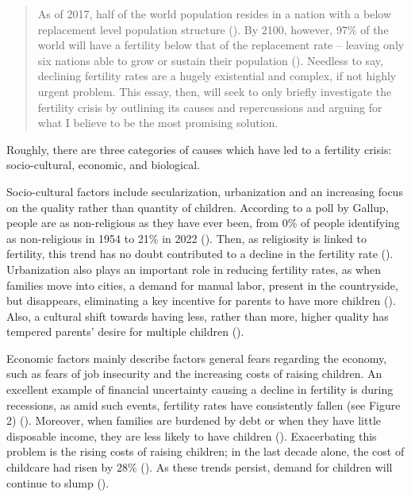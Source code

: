 
\begin{abstract}
As of 2017, half of the world population resides in a nation with a below replacement level population structure (\cite{frejka2017half}). By 2100, however, 97\% of the world will have a fertility below that of the replacement rate – leaving only six nations able to grow or sustain their population (\cite{thelancet2024dramatic}). Needless to say, declining fertility rates are a hugely existential and complex, if not highly urgent problem. This essay, then, will seek to only briefly investigate the fertility crisis by outlining its causes and repercussions and arguing for what I believe to be the most promising solution. 
\end{abstract}

Roughly, there are three categories of causes which have led to a fertility crisis: socio-cultural, economic, and biological.  

Socio-cultural factors include secularization, urbanization and an increasing focus on the quality rather than quantity of children. According to a poll by Gallup, people are as non-religious as they have ever been, from 0\% of people identifying as non-religious in 1954 to 21\% in 2022 (\cite{newport2022slowdown}). Then, as religiosity is linked to fertility, this trend has no doubt contributed to a decline in the fertility rate (\cite[p.\ 85]{kearney2023causes}). Urbanization also plays an important role in reducing fertility rates, as when families move into cities, a demand for manual labor, present in the countryside, but  disappears, eliminating a key incentive for parents to have more children (\cite{bricker2021birthrates}). Also, a cultural shift towards having less, rather than more, higher quality has tempered parents’ desire for multiple children (\cite[p.\ 84]{kearney2023causes}).  

Economic factors mainly describe factors general fears regarding the economy, such as fears of job insecurity and the increasing costs of raising children. An excellent example of financial uncertainty causing a decline in fertility is during recessions, as amid such events, fertility rates have consistently fallen (see Figure 2) (\cite[p.\ 83]{kearney2023causes}). Moreover, when families are burdened by debt or when they have little disposable income, they are less likely to have children (\cite[pp.\ 82, 84]{kearney2023causes}). Exacerbating this problem is the rising costs of raising children; in the last decade alone, the cost of childcare had risen by 28\% (\cite{usafacts2022childcare}). As these trends persist, demand for children will continue to slump (\cites{becker1960economic}{lino2017cost}). 

